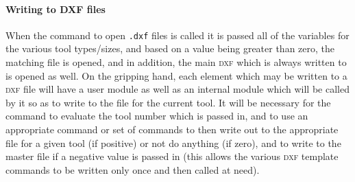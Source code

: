 \documentclass{ltxdoc}
\begin{document}
% 
%
%
%
% 
%


\paragraph{Writing to DXF files}
 
When the command to open \verb|.dxf| files is called it is passed all of the variables for the various tool types/sizes, and based on a value being greater than zero, the matching file is opened, and in addition, the main \textsc{dxf} which is always written to is opened as well. On the gripping hand, each element which may be written to a \textsc{dxf} file will have a user module as well as an internal module which will be called by it so as to write to the file for the current tool. It will be necessary for the  command to evaluate the tool number which is passed in, and to use an appropriate command or set of commands to then write out to the appropriate file for a given tool (if positive) or not do anything (if zero), and to write to the master file if a negative value is passed in (this allows the various \textsc{dxf} template commands to be written only once and then called at need).
\end{document}
